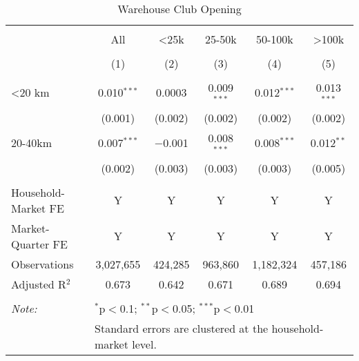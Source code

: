 
\begin{table}[!htbp] \centering 
  \caption{Warehouse Club Opening} 
  \label{tab:clubOpening} 
\begin{tabular}{@{\extracolsep{5pt}}lccccc} 
\\[-1.8ex]\hline 
\hline \\[-1.8ex] 
 & All & <25k & 25-50k & 50-100k & >100k \\ 
\\[-1.8ex] & (1) & (2) & (3) & (4) & (5)\\ 
\hline \\[-1.8ex] 
 <20 km & 0.010$^{***}$ & 0.0003 & 0.009$^{***}$ & 0.012$^{***}$ & 0.013$^{***}$ \\ 
  & (0.001) & (0.002) & (0.002) & (0.002) & (0.002) \\ 
  20-40km & 0.007$^{***}$ & $-$0.001 & 0.008$^{***}$ & 0.008$^{***}$ & 0.012$^{**}$ \\ 
  & (0.002) & (0.003) & (0.003) & (0.003) & (0.005) \\ 
 \hline \\[-1.8ex] 
Household-Market FE & Y & Y & Y & Y & Y \\ 
Market-Quarter FE & Y & Y & Y & Y & Y \\ 
Observations & 3,027,655 & 424,285 & 963,860 & 1,182,324 & 457,186 \\ 
Adjusted R$^{2}$ & 0.673 & 0.642 & 0.671 & 0.689 & 0.694 \\ 
\hline 
\hline \\[-1.8ex] 
\textit{Note:}  & \multicolumn{5}{l}{$^{*}$p$<$0.1; $^{**}$p$<$0.05; $^{***}$p$<$0.01} \\ 
 & \multicolumn{5}{l}{Standard errors are clustered at the household-market level.} \\ 
\end{tabular} 
\end{table} 
